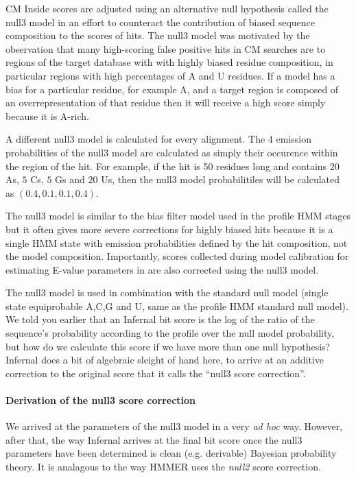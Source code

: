 CM Inside scores are adjusted using an alternative null hypothesis
called the null3 model in an effort to counteract the contribution of
biased sequence composition to the scores of hits. The null3 model
was motivated by the observation that many high-scoring false positive
hits in CM searches are to regions of the target database with with
highly biased residue composition, in particular regions with high
percentages of A and U residues.  If a model has a bias for a
particular residue, for example A, and a target region is composed of
an overrepresentation of that residue then it will receive a high
score simply because it is A-rich.

A different null3 model is calculated for every alignment. The 4
emission probabilities of the null3 model are calculated as 
simply their occurence within the region of the hit. For example, if
the hit is 50 residues long and contains $20$ As, $5$ Cs, $5$ Gs and $20$ Us,
then the null3 model probabilitiles will be calculated as $(0.4, 0.1,
0.1, 0.4)$. 

The null3 model is similar to the bias filter model used in the
profile HMM stages but it often gives more severe corrections for
highly biased hits because it is a single HMM state with emission
probabilities defined by the hit composition, not the model
composition. Importantly, scores collected during model calibration
for estimating E-value parameters in  are also
corrected using the null3 model.

The null3 model is used in combination with the standard null model
(single state equiprobable A,C,G and U, same as the profile HMM
standard null model). We told you earlier that an Infernal bit score
is the log of the ratio of the sequence's probability according to the
profile over the null model probability, but how do we calculate this
score if we have more than one null hypothesis?  Infernal does a bit
of algebraic sleight of hand here, to arrive at an additive correction
to the original score that it calls the ``null3 score correction''.

\paragraph{Derivation of the null3 score correction}

We arrived at the parameters of the null3 model in a very \emph{ad
hoc} way. However, after that, the way Infernal arrives at the final bit
score once the null3 parameters have been determined is clean
(e.g. derivable) Bayesian probability theory. It is analagous to the
way HMMER uses the \emph{null2} score correction.

